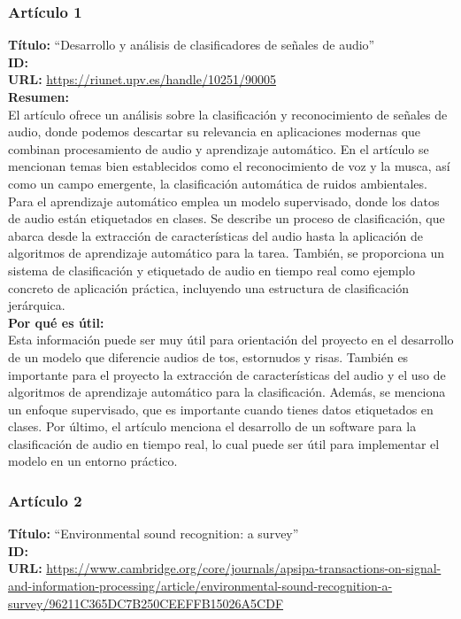 \subsubsection*{Artículo 1}
    \textbf{Título:}
    “Desarrollo y análisis de clasificadores de señales de audio”
    \\
    \textbf{ID: \cite{aguirre2017desarrollo}}
    \\
    \textbf{URL:}
    \url{https://riunet.upv.es/handle/10251/90005}
    \\
    \textbf{Resumen:\\}
    El artículo ofrece un análisis sobre la clasificación y reconocimiento de señales de audio, donde podemos descartar su relevancia en aplicaciones modernas que combinan procesamiento de audio y aprendizaje automático. En el artículo se mencionan temas bien establecidos como el reconocimiento de voz y la musca, así como un campo emergente, la clasificación automática de ruidos ambientales. Para el aprendizaje automático emplea un modelo supervisado, donde los datos de audio están etiquetados en clases. Se describe un proceso de clasificación, que abarca desde la extracción de características del audio hasta la aplicación de algoritmos de aprendizaje automático para la tarea. También, se proporciona un sistema de clasificación y etiquetado de audio en tiempo real como ejemplo concreto de aplicación práctica, incluyendo una estructura de clasificación jerárquica.    \\
    \textbf{Por qué es útil:\\}
    Esta información puede ser muy útil para orientación del proyecto en el desarrollo de un modelo que diferencie audios de tos, estornudos y risas. También es importante para el proyecto la extracción de características del audio y el uso de algoritmos de aprendizaje automático para la clasificación. Además, se menciona un enfoque supervisado, que es importante cuando tienes datos etiquetados en clases. Por último, el artículo menciona el desarrollo de un software para la clasificación de audio en tiempo real, lo cual puede ser útil para implementar el modelo en un entorno práctico.\subsubsection*{Artículo 2}
    \textbf{Título:}
    “Environmental sound recognition: a survey”
    \\
    \textbf{ID: \cite{chachada2014environmental}}
    \\
    \textbf{URL:}
    \url{https://www.cambridge.org/core/journals/apsipa-transactions-on-signal-and-information-processing/article/environmental-sound-recognition-a-survey/96211C365DC7B250CEEFFB15026A5CDF}
